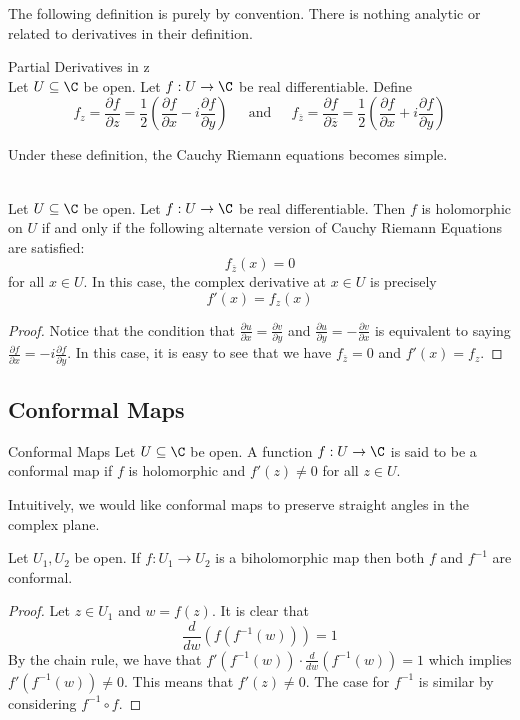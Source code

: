 \documentclass[a4paper]{article}
\begin{document}
The following definition is purely by convention. There is nothing analytic or related to derivatives in their definition. 

\begin{defn}{Partial Derivatives in z}{}\\
Let $U\subseteq\C$ be open. Let $f:U\to\C$ be real differentiable. Define $$f_z=\frac{\partial f}{\partial z}=\frac{1}{2}\left(\frac{\partial f}{\partial x}-i\frac{\partial f}{\partial y}\right)\;\;\;\;\text{ and }\;\;\;\;f_{\overline{z}}=\frac{\partial f}{\partial \overline{z}}=\frac{1}{2}\left(\frac{\partial f}{\partial x}+i\frac{\partial f}{\partial y}\right)$$
\end{defn}

Under these definition, the Cauchy Riemann equations becomes simple. 

\begin{lmm}{}{}\\
Let $U\subseteq\C$ be open. Let $f:U\to\C$ be real differentiable. Then $f$ is holomorphic on $U$ if and only if the following alternate version of Cauchy Riemann Equations are satisfied: $$f_{\overline{z}}(x)=0$$ for all $x\in U$. In this case, the complex derivative at $x\in U$ is precisely $$f'(x)=f_z(x)$$ 
\begin{proof}
Notice that the condition that $\frac{\partial u}{\partial x}=\frac{\partial v}{\partial y}$ and $\frac{\partial u}{\partial y}=-\frac{\partial v}{\partial x}$ is equivalent to saying $\frac{\partial f}{\partial x}=-i\frac{\partial f}{\partial y}$. In this case, it is easy to see that we have $f_{\overline{z}}=0$ and $f'(x)=f_z$. 
\end{proof}
\end{lmm}

\subsection{Conformal Maps}
\begin{defn}{Conformal Maps}{} Let $U\subseteq\C$ be open. A function $f:U\to\C$ is said to be a conformal map if $f$ is holomorphic and $f'(z)\neq 0$ for all $z\in U$. 
\end{defn}

Intuitively, we would like conformal maps to preserve straight angles in the complex plane. 

\begin{lmm}{}{} Let $U_1,U_2$ be open. If $f:U_1\to U_2$ is a biholomorphic map then both $f$ and $f^{-1}$ are conformal. 
\begin{proof}
Let $z\in U_1$ and $w=f(z)$. It is clear that $$\frac{d}{dw}\left(f(f^{-1}(w))\right)=1$$ By the chain rule, we have that $f'(f^{-1}(w))\cdot\frac{d}{dw}(f^{-1}(w))=1$ which implies $f'(f^{-1}(w))\neq 0$. This means that $f'(z)\neq 0$. The case for $f^{-1}$ is similar by considering $f^{-1}\circ f$. 
\end{proof}
\end{lmm}
\end{document}
